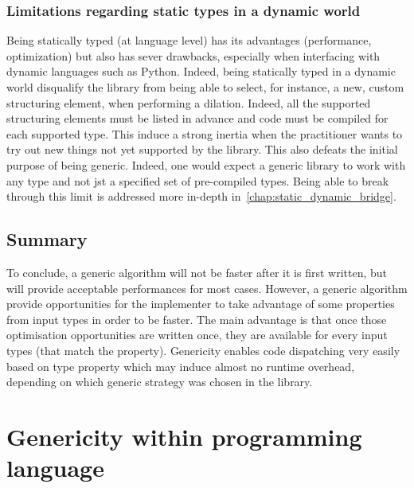 \subsubsection{Limitations regarding static types in a dynamic world}

Being statically typed (at language level) has its advantages (performance, optimization) but also has sever drawbacks,
especially when interfacing with dynamic languages such as Python. Indeed, being statically typed in a dynamic world
disqualify the library from being able to select, for instance, a new, custom structuring element, when performing a
dilation. Indeed, all the supported structuring elements must be listed in advance and code must be compiled for each
supported type. This induce a strong inertia when the practitioner wants to try out new things not yet supported by the
library. This also defeats the initial purpose of being generic. Indeed, one would expect a generic library to work with
any type and not jst a specified set of pre-compiled types. Being able to break through this limit is addressed more
in-depth in~\cref{chap:static_dynamic_bridge}.


\subsection{Summary}

To conclude, a generic algorithm will not be faster after it is first written, but will provide acceptable performances
for most cases. However, a generic algorithm provide opportunities for the implementer to take advantage of some
properties from input types in order to be faster. The main advantage is that once those optimisation opportunities are
written once, they are available for every input types (that match the property). Genericity enables code dispatching
very easily based on type property which may induce almost no runtime overhead, depending on which generic strategy was
chosen in the library.


\section{Genericity within programming language}
\label{sec:gen.genericity.within.programming.languages}

